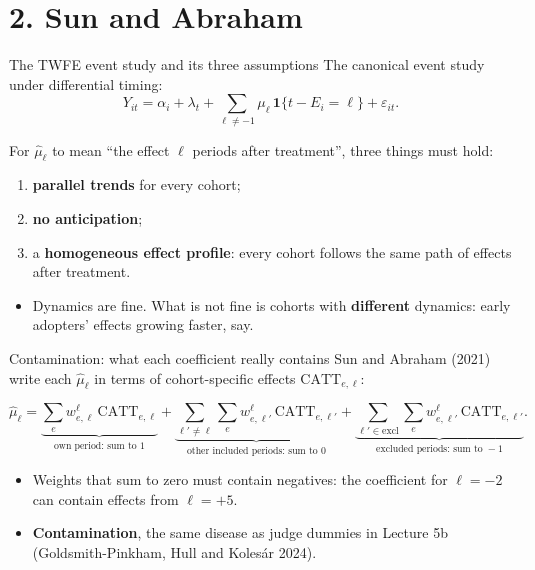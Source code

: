 \documentclass[
  11pt,
  ignorenonframetext,
  aspectratio=169,
]{beamer}
\providecommand{\tightlist}{%
  \setlength{\itemsep}{0pt}\setlength{\parskip}{0pt}}
\begin{document}
\section{2. Sun and Abraham}\label{sun-and-abraham}

\begin{frame}{The TWFE event study and its three assumptions}
\protect{}\label{the-twfe-event-study-and-its-three-assumptions}
The canonical event study under differential timing: \[
Y_{it} = \alpha_i + \lambda_t + \sum_{\ell \ne -1}\mu_\ell\,\mathbf{1}\{t - E_i = \ell\} + \varepsilon_{it}.
\]

For \(\hat\mu_\ell\) to mean ``the effect \(\ell\) periods after
treatment'', three things must hold:

\begin{enumerate}
\tightlist
\item
  \textbf{parallel trends} for every cohort;
\item
  \textbf{no anticipation};
\item
  a \textbf{homogeneous effect profile}: every cohort follows the same
  path of effects after treatment.
\end{enumerate}

\begin{itemize}
\tightlist
\item
  Dynamics are fine. What is not fine is cohorts with \textbf{different}
  dynamics: early adopters' effects growing faster, say.
\end{itemize}
\end{frame}

\begin{frame}{Contamination: what each coefficient really contains}
\protect{}\label{contamination-what-each-coefficient-really-contains}
Sun and Abraham (2021) write each \(\hat\mu_\ell\) in terms of
cohort-specific effects \(\text{CATT}_{e,\ell}\):

\[
\hat\mu_\ell = \underbrace{\sum_e w^{\ell}_{e,\ell}\,\text{CATT}_{e,\ell}}_{\text{own period: sum to } 1} +
\underbrace{\sum_{\ell' \ne \ell}\sum_e w^{\ell}_{e,\ell'}\,\text{CATT}_{e,\ell'}}_{\text{other included periods: sum to } 0} +
\underbrace{\sum_{\ell' \in \text{excl}}\sum_e w^{\ell}_{e,\ell'}\,\text{CATT}_{e,\ell'}}_{\text{excluded periods: sum to } -1}.
\]

\begin{itemize}
\tightlist
\item
  Weights that sum to zero must contain negatives: the coefficient for
  \(\ell = -2\) can contain effects from \(\ell = +5\).
\item
  \textbf{Contamination}, the same disease as judge dummies in Lecture
  5b (Goldsmith-Pinkham, Hull and Kolesár 2024).
\end{itemize}
\end{frame}
\end{document}
